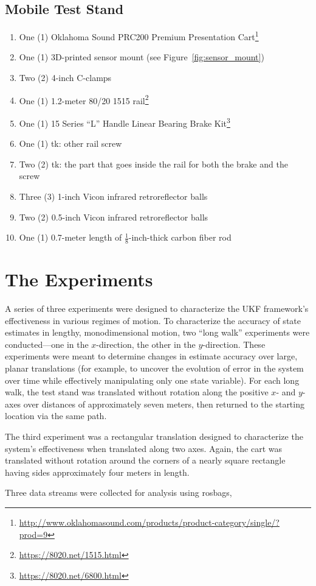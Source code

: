 \subsection{Mobile Test Stand}
\begin{enumerate}
\item One (1) Oklahoma Sound PRC200 Premium Presentation Cart\footnote{\url{http://www.oklahomasound.com/products/product-category/single/?prod=9}}
\item One (1) 3D-printed sensor mount (see Figure~\ref{fig:sensor_mount})
\item Two (2) 4-inch C-clamps
\item One (1) 1.2-meter 80/20 1515 rail\footnote{\url{https://8020.net/1515.html}}
\item One (1) 15 Series ``L'' Handle Linear Bearing Brake Kit\footnote{\url{https://8020.net/6800.html}}
\item One (1) tk: other rail screw
\item Two (2) tk: the part that goes inside the rail for both the brake and the screw
\item Three (3) 1-inch Vicon infrared retroreflector balls
\item Two (2) 0.5-inch Vicon infrared retroreflector balls
\item One (1) 0.7-meter length of $\frac{1}{8}$-inch-thick carbon fiber rod
\end{enumerate}


\section{The Experiments}

A series of three experiments were designed to characterize the UKF framework's effectiveness in various regimes of motion. To characterize the accuracy of state estimates in lengthy, monodimensional motion, two ``long walk'' experiments were conducted---one in the $x$-direction, the other in the $y$-direction. These experiments were meant to determine changes in estimate accuracy over large, planar translations (for example, to uncover the evolution of error in the system over time while effectively manipulating only one state variable). For each long walk, the test stand was translated without rotation along the positive $x$- and $y$-axes over distances of approximately seven meters, then returned to the starting location via the same path.

The third experiment was a rectangular translation designed to characterize the system's effectiveness when translated along two axes. Again, the cart was translated without rotation around the corners of a nearly square rectangle having sides approximately four meters in length.

Three data streams were collected for analysis using rosbags, 